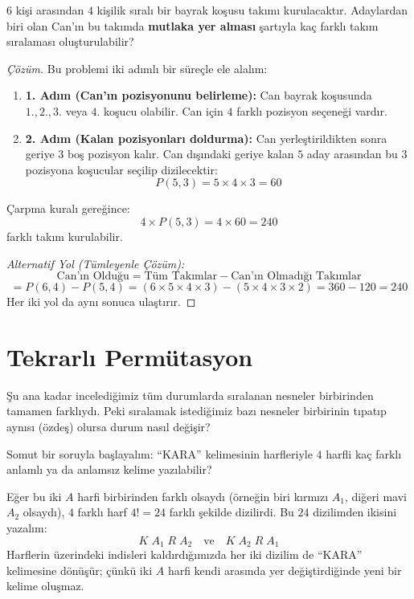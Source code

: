 \begin{example}
$6$ kişi arasından $4$ kişilik sıralı bir bayrak koşusu takımı kurulacaktır. Adaylardan biri olan Can'ın bu takımda \textbf{mutlaka yer alması} şartıyla kaç farklı takım sıralaması oluşturulabilir?
\end{example}
\begin{proof}[Çözüm]
Bu problemi iki adımlı bir süreçle ele alalım:
\begin{enumerate}
  \item \textbf{1. Adım (Can'ın pozisyonunu belirleme):} Can bayrak koşusunda $1., 2., 3.$ veya $4.$ koşucu olabilir. Can için $4$ farklı pozisyon seçeneği vardır.
  \item \textbf{2. Adım (Kalan pozisyonları doldurma):} Can yerleştirildikten sonra geriye $3$ boş pozisyon kalır. Can dışındaki geriye kalan $5$ aday arasından bu $3$ pozisyona koşucular seçilip dizilecektir:
  \[ P(5, 3) = 5 \times 4 \times 3 = 60 \]
\end{enumerate}
Çarpma kuralı gereğince:
\[ 4 \times P(5, 3) = 4 \times 60 = 240 \]
farklı takım kurulabilir.

\textit{Alternatif Yol (Tümleyenle Çözüm):}
\[ \text{Can'ın Olduğu} = \text{Tüm Takımlar} - \text{Can'ın Olmadığı Takımlar} \]
\[ = P(6, 4) - P(5, 4) = (6 \times 5 \times 4 \times 3) - (5 \times 4 \times 3 \times 2) = 360 - 120 = 240 \]
Her iki yol da aynı sonuca ulaştırır.
\end{proof}


\section{Tekrarlı Permütasyon}

Şu ana kadar incelediğimiz tüm durumlarda sıralanan nesneler birbirinden tamamen farklıydı. Peki sıralamak istediğimiz bazı nesneler birbirinin tıpatıp aynısı (özdeş) olursa durum nasıl değişir?

Somut bir soruyla başlayalım: ``KARA'' kelimesinin harfleriyle $4$ harfli kaç farklı anlamlı ya da anlamsız kelime yazılabilir?

Eğer bu iki $A$ harfi birbirinden farklı olsaydı (örneğin biri kırmızı $A_1$, diğeri mavi $A_2$ olsaydı), $4$ farklı harf $4! = 24$ farklı şekilde dizilirdi. 
Bu $24$ dizilimden ikisini yazalım:
\[ K \; A_1 \; R \; A_2 \quad \text{ve} \quad K \; A_2 \; R \; A_1 \]
Harflerin üzerindeki indisleri kaldırdığımızda her iki dizilim de ``KARA'' kelimesine dönüşür; çünkü iki $A$ harfi kendi arasında yer değiştirdiğinde yeni bir kelime oluşmaz. 

